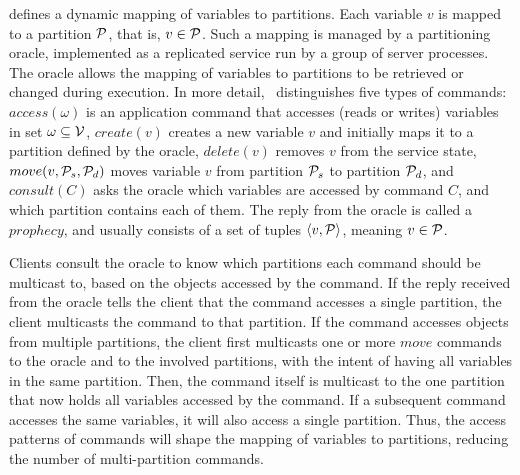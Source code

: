 \dynastar defines a dynamic mapping of variables to partitions.
Each variable $v$ is mapped to a partition $\mathcal{P}$, that is, $v \in \mathcal{P}$.
Such a mapping is managed by a partitioning oracle, implemented as a replicated service run by a group of server processes.
The oracle allows the mapping of variables to partitions to be retrieved or changed during execution.
In more detail, \dynastar\ distinguishes five types of commands:
$access(\omega)$ is an application command that accesses (reads or writes) variables in set $\omega \subseteq \mathcal{V}$,
$create(v)$ creates a new variable $v$ and initially maps it to a partition defined by the oracle,
$delete(v)$ removes $v$ from the service state,
$move(v,\mathcal{P}_s,\mathcal{P}_d)$ moves variable $v$ from partition $\mathcal{P}_s$ to partition $\mathcal{P}_d$,
and $consult(C)$ asks the oracle which variables are accessed by command $C$, and which partition contains each of them.
The reply from the oracle is called a $prophecy$, and usually consists of a set of tuples $\langle v, \mathcal{P} \rangle$, meaning $v \in \mathcal{P}$.


Clients consult the oracle to know which partitions each command should be multicast to, based on the objects accessed by the command.
If the reply received from the oracle tells the client that the command accesses a single partition, the client multicasts the command to that partition.
If the command accesses objects from multiple partitions, the client first multicasts one or more $move$ commands to the oracle and to the involved partitions, with the intent of having all variables in the same partition.
Then, the command itself is multicast to the one partition that now holds all variables accessed by the command.
If a subsequent command accesses the same variables, it will also access a single partition.
Thus, the access patterns of commands will shape the mapping of variables to partitions, reducing the number of multi-partition commands.

